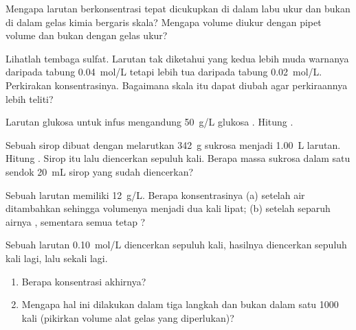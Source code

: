 \begin{exercise}[$\star\star$]\label{exo:g10:concentration-and-dilution:7}
Mengapa larutan berkonsentrasi tepat dicukupkan di dalam labu ukur dan
bukan di dalam gelas kimia bergaris skala? Mengapa volume 
diukur dengan pipet volume dan bukan dengan gelas ukur?
\end{exercise}

\begin{exercise}[$\star\star$]\label{exo:g10:concentration-and-dilution:8}
Lihatlah  tembaga sulfat. Larutan tak diketahui yang
kedua lebih muda warnanya daripada tabung \qty{0.04}{mol/L} tetapi lebih
tua daripada tabung \qty{0.02}{mol/L}. Perkirakan konsentrasinya.
Bagaimana skala itu dapat diubah agar perkiraannya lebih teliti?
\end{exercise}

\begin{exercise}[$\star\star$]\label{exo:g10:concentration-and-dilution:9}
Larutan glukosa untuk infus mengandung \qty{50}{g/L} glukosa
. Hitung .
\end{exercise}

\begin{exercise}[$\star\star$]\label{exo:g10:concentration-and-dilution:10}
Sebuah sirop dibuat dengan melarutkan \qty{342}{g} sukrosa
 menjadi \qty{1.00}{L} larutan. Hitung . Sirop itu lalu diencerkan sepuluh kali. Berapa massa sukrosa
dalam satu sendok \qty{20}{mL} sirop yang sudah diencerkan?
\end{exercise}

\begin{exercise}[$\star\star$]\label{exo:g10:concentration-and-dilution:11}
Sebuah larutan memiliki  \qty{12}{g/L}. Berapa
konsentrasinya (a) setelah air ditambahkan sehingga volumenya menjadi dua
kali lipat; (b) setelah separuh airnya , sementara semua  tetap ?
\end{exercise}

\begin{exercise}[$\star\star\star$]\label{exo:g10:concentration-and-dilution:12}
Sebuah larutan \qty{0.10}{mol/L} diencerkan sepuluh kali, hasilnya
diencerkan sepuluh kali lagi, lalu sekali lagi.
\begin{enumerate}
  \item Berapa konsentrasi akhirnya?
  \item Mengapa hal ini dilakukan dalam tiga langkah dan bukan dalam satu
         1000 kali (pikirkan volume alat gelas yang diperlukan)?
\end{enumerate}
\end{exercise}

